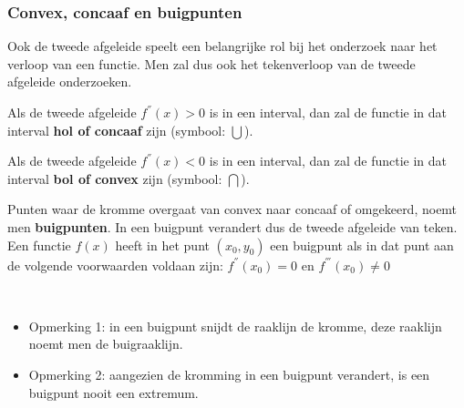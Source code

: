 \subsubsection{Convex, concaaf en buigpunten}

Ook de tweede afgeleide speelt een belangrijke rol bij het
onderzoek naar het verloop van een functie. Men zal dus ook het tekenverloop
van de tweede afgeleide onderzoeken.


\begin{definitie}
	Als de tweede afgeleide $f^{''}(x)>0$ is in een interval,
dan zal de functie in dat interval \textbf{hol of concaaf} zijn (symbool:
$\bigcup$).

Als de tweede afgeleide $f^{''}(x)<0$ is in een interval,
dan zal de functie in dat interval \textbf{bol of convex} zijn (symbool:
$\bigcap$).

Punten waar de kromme overgaat van convex naar concaaf of
omgekeerd, noemt men \textbf{buigpunten}. In een buigpunt verandert
dus de tweede afgeleide van teken. Een functie $f(x)$ heeft in het
punt $(x_{0},y_{0})$ een buigpunt als in dat punt aan de volgende
voorwaarden voldaan zijn: $f^{''}(x_{0})=0$ en $f^{'''}(x_{0})\neq0$

\end{definitie}


\begin{opmerking}
	\ \\
	\begin{itemize}
	\item Opmerking 1: in een buigpunt snijdt de raaklijn de kromme,
	deze raaklijn noemt men de buigraaklijn.
	
	\item Opmerking 2: aangezien de kromming in een buigpunt verandert,
	is een buigpunt nooit een extremum.
\end{itemize}

\end{opmerking}


